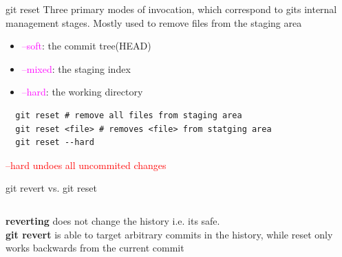 \documentclass{beamer}
\begin{document}
\begin{frame}[fragile,t]{git reset}\vspace{10pt}
  Three primary modes of invocation, which correspond to gits internal management stages. Mostly used to remove files from the staging area
  \begin{itemize}
    \item \textcolor{magenta}{--soft}: the commit tree(HEAD)
    \item \textcolor{magenta}{--mixed}: the staging index
    \item \textcolor{magenta}{--hard}: the working directory
  \end{itemize} 

  \begin{lstlisting}
  git reset # remove all files from staging area
  git reset <file> # removes <file> from statging area
  git reset --hard  \end{lstlisting}\vspace{10pt}
  \textcolor{red}{ --hard undoes all uncommited changes}

\end{frame}

\begin{frame}[fragile,t]{git revert vs. git reset}\vspace{10pt}
  \begin{columns}
    \begin{column}{0.5\textwidth} 
      \textbf{reverting} does not change the history i.e. its safe.\vspace{10pt}\\
      \textbf{git revert} is able to target arbitrary commits in the history, while reset only works backwards from the current commit
    \end{column}
    \begin{column}{0.5\textwidth} 
      \centering
      
    \end{column}

  \end{columns}
\end{frame}
\end{document}
